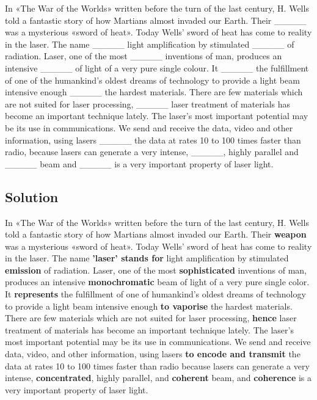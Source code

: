 In «The War of the Worlds» written before the turn of the last century, H. Wells told
a fantastic story of how Martians almost invaded our Earth. Their 
\_\_\_\_\_ was a mysterious «sword of heat». Today Wells’ sword of heat has come to
reality in the laser. The name \_\_\_\_\_ light amplification by
stimulated \_\_\_\_\_ of radiation. Laser, one of the most 
\_\_\_\_\_ inventions of man, produces an intensive \_\_\_\_\_ of light
of a very pure single colour. It \_\_\_\_\_ the fulfillment of one
of the humankind’s oldest dreams of technology to provide a light beam intensive
enough \_\_\_\_\_ the hardest materials. There are few materials which
are not suited for laser processing, \_\_\_\_\_ laser treatment of
materials has become an important technique lately. The laser’s most important
potential may be its use in communications. We send and receive the data, video and
other information, using lasers \_\_\_\_\_ the data at rates 10 to 100
times faster than radio, because lasers can generate a very intense, 
\_\_\_\_\_, highly parallel and \_\_\_\_\_ beam and 
\_\_\_\_\_ is a very important property of laser light.

\subsection*{Solution}
In «The War of the Worlds» written before the turn of the last century, H. Wells told
a fantastic story of how Martians almost invaded our Earth. Their 
\textbf{weapon} was a mysterious «sword of heat». Today Wells’ sword of heat has come
to reality in the laser. The name \textbf{'laser' stands for} light
amplification by stimulated \textbf{emission} of radiation. Laser, one of
the most \textbf{sophisticated} inventions of man, produces an intensive
\textbf{monochromatic} beam of light of a very pure single color. It
\textbf{represents} the fulfillment of one of humankind’s oldest dreams
of technology to provide a light beam intensive enough \textbf{to vaporise}
the hardest materials. There are few materials which are not suited for laser processing,
\textbf{hence} laser treatment of materials has become an important
technique lately. The laser’s most important potential may be its use in communications.
We send and receive data, video, and other information, using lasers 
\textbf{to encode and transmit} the data at rates 10 to 100 times faster than radio
because lasers can generate a very intense, \textbf{concentrated},
highly parallel, and \textbf{coherent} beam, and 
\textbf{coherence} is a very important property of laser light.

